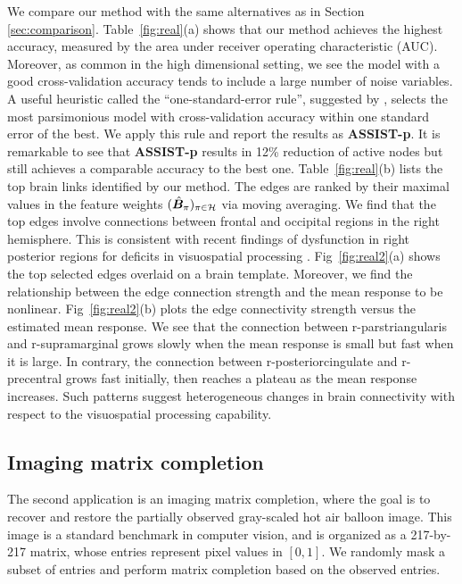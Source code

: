 \documentclass[11pt]{article}
\theoremstyle{plain}
\theoremstyle{definition}
\begin{document}
We compare our method with the same alternatives as in Section \ref{sec:comparison}. Table~\ref{fig:real}(a) shows that our method achieves the highest accuracy, measured by the area under receiver operating characteristic (AUC). Moreover, as common in the high dimensional setting, we see the model with a good cross-validation accuracy tends to include a large number of noise variables. A useful heuristic called the ``one-standard-error rule'', suggested by \cite{hastie2015statistical}, selects the most parsimonious model with cross-validation accuracy within one standard error of the best. We apply this rule and report the results as {\bf \footnotesize ASSIST-p}. It is remarkable to see that {\bf \footnotesize ASSIST-p} results in 12\% reduction of active nodes but still achieves a comparable accuracy to the best one. Table~\ref{fig:real}(b) lists the top brain links identified by our method. The edges are ranked by their maximal values in the feature weights $(\hat {\bm B}_\pi)_{\pi \in \mathcal{H}}$ via moving averaging. We find that the top edges involve connections between frontal and occipital regions in the right hemisphere. This is consistent with recent findings of dysfunction in right posterior regions for deficits in visuospatial processing \citep{wang2019common}. Fig~\ref{fig:real2}(a) shows the top selected edges overlaid on a brain template. Moreover, we find the relationship between the edge connection strength and the mean response to be nonlinear. Fig~\ref{fig:real2}(b) plots the edge connectivity strength versus the estimated mean response. We see that the connection between r-parstriangularis and r-supramarginal grows slowly when the mean response is small but fast when it is large. In contrary, the connection between r-posteriorcingulate and r-precentral  grows fast initially, then reaches a plateau as the mean response increases. Such patterns suggest heterogeneous changes in brain connectivity with respect to the visuospatial processing capability. 



\subsection{Imaging matrix completion}
\label{sec:completion}

The second application is an imaging matrix completion, where the goal is to recover and restore the partially observed gray-scaled hot air balloon image. This image is a standard benchmark in computer vision, and is organized as a 217-by-217 matrix, whose entries represent pixel values in $[0,1]$. We randomly mask a subset of entries and perform matrix completion based on the observed entries. 
\end{document}
